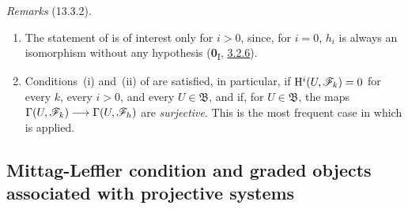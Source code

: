 \begin{env}[13.3.2]
\label{0.13.3.2}
\emph{Remarks} (13.3.2).
\begin{enumerate}
  \item[{\rm(i)}]
  The statement of  is of interest only for $i>0$,
  since, for $i=0$, $h_i$ is always an isomorphism without any
  hypothesis (\textbf{0}\textsubscript{I}, \hyperref[0.3.2.6]{3.2.6}).

  \item[{\rm(ii)}]
  Conditions~{\rm(i)} and~{\rm(ii)} of  are satisfied,
  in particular, if
  $\mathrm{H}^i(U,\mathscr{F}_k)=0$ for every $k$, every $i>0$, and every
  $U\in\mathfrak{B}$, and if, for $U\in\mathfrak{B}$, the maps $\Gamma(U,\mathscr{F}_k)\longrightarrow\Gamma(U,\mathscr{F}_h)$
  are \emph{surjective}. This is the most frequent case in which
   is applied.
\end{enumerate}
\end{env}

\subsection{Mittag-Leffler condition and graded objects associated with projective systems}
\label{subsection:0.13.4}
\label{0.13.4}

